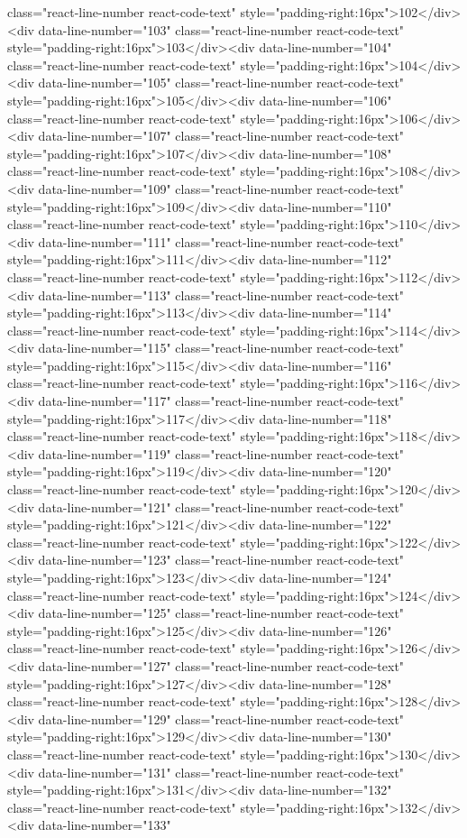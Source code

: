 {{{{{{{{{{{{{{{{{{{{{{{{{{{{{{{class="react-line-number react-code-text" style="padding-right:16px">102</div><div data-line-number="103" class="react-line-number react-code-text" style="padding-right:16px">103</div><div data-line-number="104" class="react-line-number react-code-text" style="padding-right:16px">104</div><div data-line-number="105" class="react-line-number react-code-text" style="padding-right:16px">105</div><div data-line-number="106" class="react-line-number react-code-text" style="padding-right:16px">106</div><div data-line-number="107" class="react-line-number react-code-text" style="padding-right:16px">107</div><div data-line-number="108" class="react-line-number react-code-text" style="padding-right:16px">108</div><div data-line-number="109" class="react-line-number react-code-text" style="padding-right:16px">109</div><div data-line-number="110" class="react-line-number react-code-text" style="padding-right:16px">110</div><div data-line-number="111" class="react-line-number react-code-text" style="padding-right:16px">111</div><div data-line-number="112" class="react-line-number react-code-text" style="padding-right:16px">112</div><div data-line-number="113" class="react-line-number react-code-text" style="padding-right:16px">113</div><div data-line-number="114" class="react-line-number react-code-text" style="padding-right:16px">114</div><div data-line-number="115" class="react-line-number react-code-text" style="padding-right:16px">115</div><div data-line-number="116" class="react-line-number react-code-text" style="padding-right:16px">116</div><div data-line-number="117" class="react-line-number react-code-text" style="padding-right:16px">117</div><div data-line-number="118" class="react-line-number react-code-text" style="padding-right:16px">118</div><div data-line-number="119" class="react-line-number react-code-text" style="padding-right:16px">119</div><div data-line-number="120" class="react-line-number react-code-text" style="padding-right:16px">120</div><div data-line-number="121" class="react-line-number react-code-text" style="padding-right:16px">121</div><div data-line-number="122" class="react-line-number react-code-text" style="padding-right:16px">122</div><div data-line-number="123" class="react-line-number react-code-text" style="padding-right:16px">123</div><div data-line-number="124" class="react-line-number react-code-text" style="padding-right:16px">124</div><div data-line-number="125" class="react-line-number react-code-text" style="padding-right:16px">125</div><div data-line-number="126" class="react-line-number react-code-text" style="padding-right:16px">126</div><div data-line-number="127" class="react-line-number react-code-text" style="padding-right:16px">127</div><div data-line-number="128" class="react-line-number react-code-text" style="padding-right:16px">128</div><div data-line-number="129" class="react-line-number react-code-text" style="padding-right:16px">129</div><div data-line-number="130" class="react-line-number react-code-text" style="padding-right:16px">130</div><div data-line-number="131" class="react-line-number react-code-text" style="padding-right:16px">131</div><div data-line-number="132" class="react-line-number react-code-text" style="padding-right:16px">132</div><div data-line-number="133" }}}}}}}}}}}}}}}}}}}}}}}}}}}}}}}
